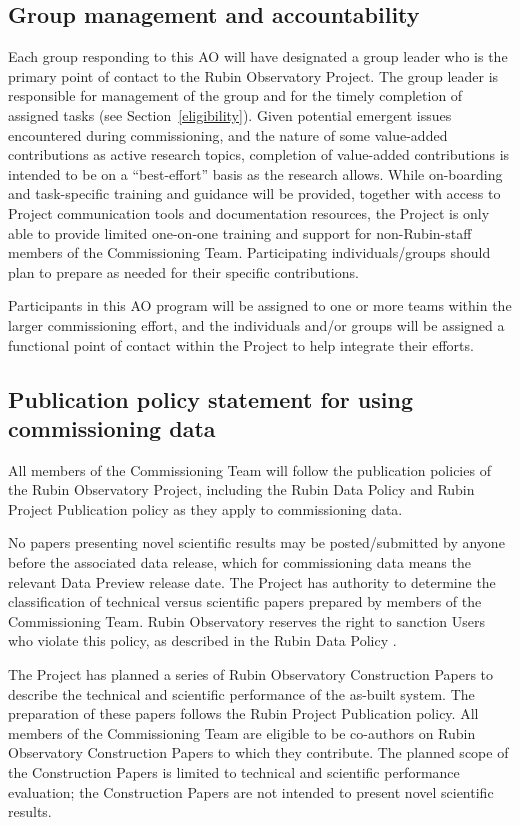 \documentclass[SE,authoryear,toc]{lsstdoc}
\begin{document}
\subsection{Group management and accountability}

Each group responding to this AO will have designated a group leader who is the primary point of contact to the Rubin Observatory Project. The group leader is responsible for management of the group and for the timely completion of assigned tasks (see Section~\ref{eligibility}). Given potential emergent issues encountered during commissioning, and the nature of some value-added contributions as active research topics, completion of value-added contributions is intended to be on a ``best-effort'' basis as the research allows. While on-boarding and task-specific training and guidance will be provided, together with access to Project communication tools and documentation resources, the Project is only able to provide limited one-on-one training and support for non-Rubin-staff members of the Commissioning Team. Participating individuals/groups should plan to prepare as needed for their specific contributions.

Participants in this AO program will be assigned to one or more teams within the larger commissioning effort, and the individuals and/or groups will be assigned a functional point of contact within the Project to help integrate their efforts.

\subsection{Publication policy statement for using commissioning data}
\label{publications}

All members of the Commissioning Team will follow the publication policies of the Rubin Observatory Project, including the Rubin Data Policy  and Rubin Project Publication policy  as they apply to commissioning data.

No papers presenting novel scientific results may be posted/submitted by anyone before the associated data release, which for commissioning data means the relevant Data Preview release date. The Project has authority to determine the classification of technical versus scientific papers prepared by members of the Commissioning Team. Rubin Observatory reserves the right to sanction Users who violate this policy, as described in the Rubin Data Policy . 

The Project has planned a series of Rubin Observatory Construction Papers to describe the technical and scientific performance of the as-built system. The preparation of these papers follows the Rubin Project Publication policy. All members of the Commissioning Team are eligible to be co-authors on Rubin Observatory Construction Papers to which they contribute. The planned scope of the Construction Papers is limited to technical and scientific performance evaluation; the Construction Papers are not intended to present novel scientific results.
\end{document}
